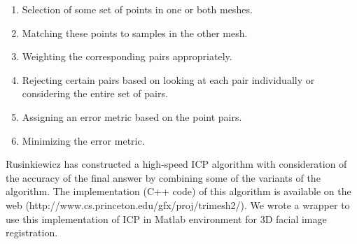 \begin{enumerate}
\item Selection of some set of points in one or both meshes.
\item Matching these points to samples in the other mesh.
\item Weighting the corresponding pairs appropriately.
\item Rejecting certain pairs based on looking at each pair
individually or considering the entire set of pairs.
\item Assigning an error metric based on the point pairs.
\item Minimizing the error metric.
\end{enumerate}

Rusinkiewicz \cite{Rusinkiewicz_thesis} has constructed a high-speed
ICP algorithm with consideration of the accuracy of the final answer
by combining some of the variants of the algorithm. The
implementation (C++ code) of this algorithm is available on the web
(http://www.cs.princeton.edu/gfx/proj/trimesh2/). We wrote a wrapper
to use this implementation of ICP in Matlab environment for 3D
facial image registration.
